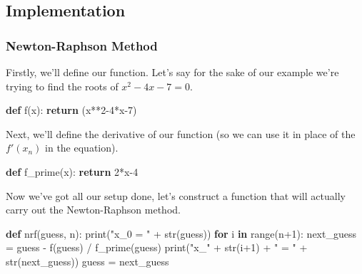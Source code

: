 \documentclass[
]{article}
\newenvironment{Shaded}{}{}
\newcommand{\BuiltInTok}[1]{#1}
\newcommand{\ControlFlowTok}[1]{\textcolor[rgb]{0.00,0.44,0.13}{\textbf{#1}}}
\newcommand{\DecValTok}[1]{\textcolor[rgb]{0.25,0.63,0.44}{#1}}
\newcommand{\KeywordTok}[1]{\textcolor[rgb]{0.00,0.44,0.13}{\textbf{#1}}}
\newcommand{\NormalTok}[1]{#1}
\newcommand{\OperatorTok}[1]{\textcolor[rgb]{0.40,0.40,0.40}{#1}}
\newcommand{\StringTok}[1]{\textcolor[rgb]{0.25,0.44,0.63}{#1}}
\begin{document}
\hypertarget{header-n52}{%
\subsection{Implementation}\label{header-n52}}

\hypertarget{header-n53}{%
\subsubsection{Newton-Raphson Method}\label{header-n53}}

Firstly, we'll define our function. Let's say for the sake of our
example we're trying to find the roots of \(x^2-4x-7=0\).

\begin{Shaded}
\begin{Highlighting}[]
\KeywordTok{def}\NormalTok{ f(x):}
    \ControlFlowTok{return}\NormalTok{ (x}\OperatorTok{**}\DecValTok{2}\OperatorTok{{-}}\DecValTok{4}\OperatorTok{*}\NormalTok{x}\OperatorTok{{-}}\DecValTok{7}\NormalTok{)}
\end{Highlighting}
\end{Shaded}

Next, we'll define the derivative of our function (so we can use it in
place of the \(f'(x_n)\) in the equation).

\begin{Shaded}
\begin{Highlighting}[]
\KeywordTok{def}\NormalTok{ f\_prime(x):}
    \ControlFlowTok{return} \DecValTok{2}\OperatorTok{*}\NormalTok{x}\OperatorTok{{-}}\DecValTok{4}
\end{Highlighting}
\end{Shaded}

Now we've got all our setup done, let's construct a function that will
actually carry out the Newton-Raphson method.

\begin{Shaded}
\begin{Highlighting}[]
\KeywordTok{def}\NormalTok{ nrf(guess, n):}
    \BuiltInTok{print}\NormalTok{(}\StringTok{"x\_0 = "} \OperatorTok{+} \BuiltInTok{str}\NormalTok{(guess))}
    \ControlFlowTok{for}\NormalTok{ i }\KeywordTok{in} \BuiltInTok{range}\NormalTok{(n}\OperatorTok{+}\DecValTok{1}\NormalTok{):}
\NormalTok{        next\_guess }\OperatorTok{=}\NormalTok{ guess }\OperatorTok{{-}}\NormalTok{ f(guess) }\OperatorTok{/}\NormalTok{ f\_prime(guess)}
        \BuiltInTok{print}\NormalTok{(}\StringTok{"x\_"} \OperatorTok{+} \BuiltInTok{str}\NormalTok{(i}\OperatorTok{+}\DecValTok{1}\NormalTok{) }\OperatorTok{+} \StringTok{" = "} \OperatorTok{+} \BuiltInTok{str}\NormalTok{(next\_guess))}
\NormalTok{        guess }\OperatorTok{=}\NormalTok{ next\_guess}
\end{Highlighting}
\end{Shaded}
\end{document}
